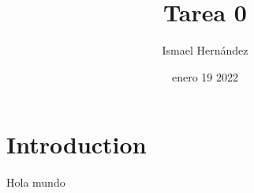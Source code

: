 \documentclass{article}
\title{Tarea 0}
\author{Ismael Hernández}
\date{enero 19 2022}
\begin{document}
\maketitle

\section{Introduction}
Hola mundo
\end{document}
